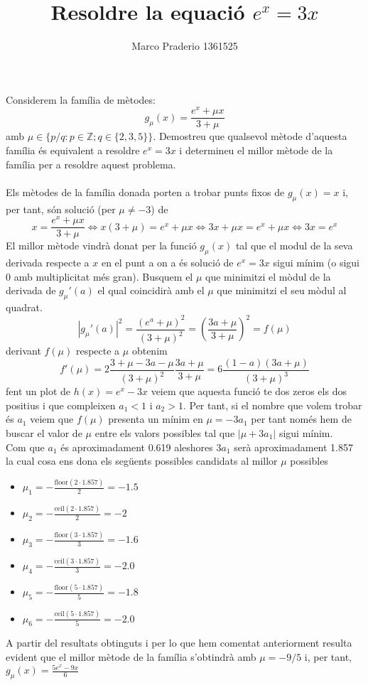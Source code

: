 \documentclass[a4paper,10pt]{article}
\title{Resoldre la equació $e^x=3x$}
\author{Marco Praderio 1361525}
\date{}
\renewcommand{\*}{\cdot}
\renewcommand{\u}{\mu}
\begin{document}
\maketitle
Considerem la família de mètodes:
\begin{equation*}
g_{\u}(x)=\frac{e^x+\u x}{3+\u}
\end{equation*}
amb $\u\in\{p/q : p \in \mathbb{Z}; q \in \{2, 3, 5\}\}$. Demostreu que qualsevol mètode
d’aquesta família  és equivalent a resoldre $e^x=3x$ i determineu el millor mètode de la família per a resoldre aquest problema.\\
\phantom{.}\\
Els mètodes de la família donada porten a trobar punts fixos de $g_{\u}(x)=x$ i, per tant, són solució (per $\u\not=-3$) de
\begin{equation*}
x=\frac{e^x+\u x}{3+\u}  \Leftrightarrow  x(3+\u)=e^x+\u x  \Leftrightarrow  3x+\u x=e^x+\u x    \Leftrightarrow  3x=e^x
\end{equation*}
El millor mètode vindrà donat per la funció $g_{\u}(x)$ tal que el modul de la seva derivada respecte a $x$ en el punt a on a és solució de $e^x=3x$ sigui mínim (o sigui 0
amb multiplicitat més gran).
Busquem el $\u$ que minimitzi el mòdul de la derivada de $g_{\u}'(a)$ el qual coincidirà amb el $\u$ que minimitzi el seu mòdul al quadrat.
\begin{equation*}
|g_{\u}'(a)|^2=\frac{(e^a+\u)^2}{(3+\u)^2}=\left(\frac{3a+\u}{3+\u}\right)^2=f(\u)
\end{equation*}
derivant $f(\u)$ respecte a $\u$ obtenim
\begin{equation*}
f'(\u)=2\frac{3+\u-3a-\u}{(3+\u)^2}\frac{3a+\u}{3+\u}=6\frac{(1-a)(3a+\u)}{(3+\u)^3}
\end{equation*}
fent un plot de $h(x)=e^x-3x$ veiem que aquesta funció te dos zeros els dos positius i que compleixen $a_1<1$ i $a_2>1$.
Per tant, si el nombre que volem trobar és $a_1$ veiem que $f(\u)$ presenta un mínim en $\u=-3a_1$ per tant només hem de buscar el valor de $\u$ entre els valors possibles
tal que $|\u+3a_1|$ sigui mínim.\\
Com que $a_1$ és aproximadament 0.619 aleshores $3a_1$ serà aproximadament 1.857 la cual cosa ens dona els següents possibles candidats al millor $\u$ possibles
\begin{itemize}
\item $\u_1=-\frac{\text{floor}(2\*1.857)}{2}=-1.5$
\item $\u_2=-\frac{\text{ceil}(2\*1.857)}{2}=-2$
\item $\u_3=-\frac{\text{floor}(3\*1.857)}{3}=-1.6$
\item $\u_4=-\frac{\text{ceil}(3\*1.857)}{3}=-2.0$
\item $\u_5=-\frac{\text{floor}(5\*1.857)}{5}=-1.8$
\item $\u_6=-\frac{\text{ceil}(5\*1.857)}{5}=-2.0$
\end{itemize}
A partir del resultats obtinguts i per lo que hem comentat anteriorment resulta evident que el millor mètode de la família s'obtindrà amb $\u=-9/5$ i, per tant, 
$g_{\u}(x)=\frac{5e^x-9x}{6}$
\end{document}

